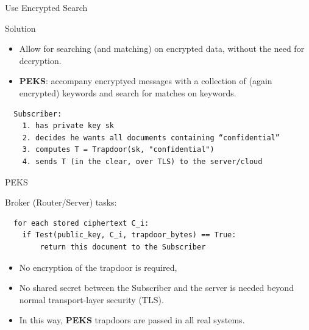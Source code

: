 \begin{frame}[fragile]{Use Encrypted Search}
  \begin{block}{Solution}
    \begin{itemize}\tightlist
      \item Allow for searching (and matching) on encrypted data, without the need for decryption.
      \item \textbf{PEKS}: accompany encryptyed messages with a collection of
            (again encrypted) keywords and search for matches on keywords.
    \end{itemize}
  \end{block}
  \begin{verbatim}
  Subscriber:
    1. has private key sk
    2. decides he wants all documents containing “confidential”
    3. computes T = Trapdoor(sk, "confidential")
    4. sends T (in the clear, over TLS) to the server/cloud
  \end{verbatim}
\end{frame}

\begin{frame}[fragile]{PEKS}
  \begin{block}{Broker (Router/Server) tasks:}
    \begin{verbatim}
  for each stored ciphertext C_i:
    if Test(public_key, C_i, trapdoor_bytes) == True:
        return this document to the Subscriber
  \end{verbatim}
  \end{block}
  \begin{itemize}\tightlist
    \item No encryption of the trapdoor is required,
    \item No shared secret between the Subscriber and the server is needed beyond
          normal transport-layer security (TLS).
    \item In this way, \textbf{PEKS} trapdoors are passed in all real systems.
  \end{itemize}
\end{frame}

